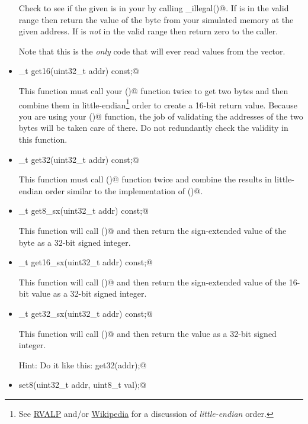 \documentclass[11pt]{article}
\begin{document}
\begin{itemize}
Check to see if the given \verb@addr@ is in your \verb@mem@ by calling 
\verb@check_illegal()@.  If \verb@addr@ is in the valid range then return 
the value of the byte from your simulated memory at the given address.
If \verb@addr@ is {\em not} in the valid range then return zero to the caller.

Note that this is the {\em only} code that will ever read values from 
the \verb@mem@ vector.

\item {}_t get16(uint32_t addr) const;@

This function must call your ()@ function twice to get two bytes 
and then combine them in little-endian\footnote{See 
\href{https://github.com/johnwinans/rvalp}{RVALP} and/or 
\href{https://en.wikipedia.org/wiki/Endianness}{Wikipedia}
for a discussion of {\em little-endian} order.} 
order to create a 16-bit return value.
Because you are using your ()@ function, the job of validating the
addresses of the two bytes will be taken care of there.  Do not redundantly 
check the validity in this function.

\item {}_t get32(uint32_t addr) const;@

This function must call ()@ function twice and combine the
results in little-endian order similar to the implementation of ()@.


\item {}_t get8_sx(uint32_t addr) const;@

This function will call ()@ and then return the sign-extended value of
the byte as a 32-bit signed integer. 

\item {}_t get16_sx(uint32_t addr) const;@

This function will call ()@ and then return the sign-extended value of
the 16-bit value as a 32-bit signed integer. 

\item {}_t get32_sx(uint32_t addr) const;@

This function will call ()@ and then return the value as a 32-bit 
signed integer.

Hint: Do it like this: \verb@return get32(addr);@



\item \verb@void set8(uint32_t addr, uint8_t val);@


\end{itemize}
\end{document}
